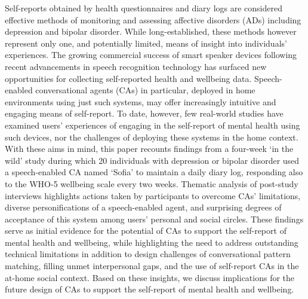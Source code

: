 Self-reports obtained by health questionnaires and diary logs are considered effective methods of monitoring and assessing affective disorders (ADs) including depression and bipolar disorder. While long-established, these methods however represent only one, and potentially limited, means of insight into individuals' experiences. 
% 
The growing commercial success of smart speaker devices following recent advancements in speech recognition technology has surfaced new opportunities for collecting self-reported health and wellbeing data. Speech-enabled conversational agents (CAs) in particular, deployed in home environments using just such systems, may offer increasingly intuitive and engaging means of self-report. To date, however, few real-world studies have examined users' experiences of engaging in the self-report of mental health using such devices, nor the challenges of deploying these systems in the home context.
% 
With these aims in mind, this paper recounts findings from a four-week `in the wild' study during which 20 individuals with depression or bipolar disorder used a speech-enabled CA named `Sofia' to maintain a daily diary log, responding also to the WHO-5 wellbeing scale every two weeks.
% 
Thematic analysis of post-study interviews highlights actions taken by participants to overcome CAs' limitations, diverse personifications of a speech-enabled agent, and surprising degrees of acceptance of this system among users' personal and social circles.
% 
These findings serve as initial evidence for the potential of CAs to support the self-report of mental health and wellbeing, while highlighting the need to address outstanding technical limitations in addition to design challenges of conversational pattern matching, filling unmet interpersonal gaps, and the use of self-report \ac{CA}s in the at-home social context.
% 
Based on these insights, we discuss implications for the future design of CAs to support the self-report of mental health and wellbeing.

